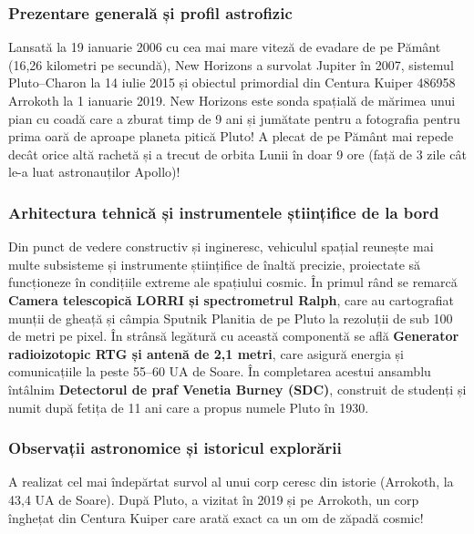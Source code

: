 \subsubsection*{Prezentare generală și profil astrofizic}
Lansată la 19 ianuarie 2006 cu cea mai mare viteză de evadare de pe Pământ (16,26 kilometri pe secundă), New Horizons a survolat Jupiter în 2007, sistemul Pluto--Charon la 14 iulie 2015 și obiectul primordial din Centura Kuiper 486958 Arrokoth la 1 ianuarie 2019. New Horizons este sonda spațială de mărimea unui pian cu coadă care a zburat timp de 9 ani și jumătate pentru a fotografia pentru prima oară de aproape planeta pitică Pluto! A plecat de pe Pământ mai repede decât orice altă rachetă și a trecut de orbita Lunii în doar 9 ore (față de 3 zile cât le-a luat astronauților Apollo)!

\subsubsection*{Arhitectura tehnică și instrumentele științifice de la bord}
Din punct de vedere constructiv și ingineresc, vehiculul spațial reunește mai multe subsisteme și instrumente științifice de înaltă precizie, proiectate să funcționeze în condițiile extreme ale spațiului cosmic. În primul rând se remarcă \textbf{Camera telescopică LORRI și spectrometrul Ralph}, care au cartografiat munții de gheață și câmpia Sputnik Planitia de pe Pluto la rezoluții de sub 100 de metri pe pixel. În strânsă legătură cu această componentă se află \textbf{Generator radioizotopic RTG și antenă de 2,1 metri}, care asigură energia și comunicațiile la peste 55--60 UA de Soare. În completarea acestui ansamblu întâlnim \textbf{Detectorul de praf Venetia Burney (SDC)}, construit de studenți și numit după fetița de 11 ani care a propus numele \guillemotleft{}Pluto\guillemotright{} în 1930.

\subsubsection*{Observații astronomice și istoricul explorării}
A realizat cel mai îndepărtat survol al unui corp ceresc din istorie (Arrokoth, la 43,4 UA de Soare). După Pluto, a vizitat în 2019 și pe Arrokoth, un corp înghețat din Centura Kuiper care arată exact ca un om de zăpadă cosmic!


